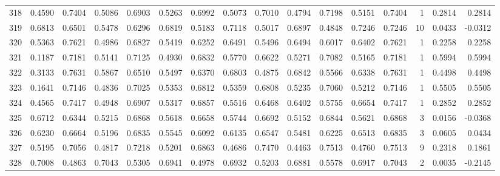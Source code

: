 \begin{tabular}{lrrrrrrrrrrrrrrr}
318 &      0.4590 &  0.7404 &  0.5086 &  0.6903 &  0.5263 &  0.6992 &  0.5073 &  0.7010 &  0.4794 &  0.7198 &   0.5151 &     0.7404 &      1 &                    0.2814 &                     0.2814 \\
319 &      0.6813 &  0.6501 &  0.5478 &  0.6296 &  0.6819 &  0.5183 &  0.7118 &  0.5017 &  0.6897 &  0.4848 &   0.7246 &     0.7246 &     10 &                    0.0433 &                    -0.0312 \\
320 &      0.5363 &  0.7621 &  0.4986 &  0.6827 &  0.5419 &  0.6252 &  0.6491 &  0.5496 &  0.6494 &  0.6017 &   0.6402 &     0.7621 &      1 &                    0.2258 &                     0.2258 \\
321 &      0.1187 &  0.7181 &  0.5141 &  0.7125 &  0.4930 &  0.6832 &  0.5770 &  0.6622 &  0.5271 &  0.7082 &   0.5165 &     0.7181 &      1 &                    0.5994 &                     0.5994 \\
322 &      0.3133 &  0.7631 &  0.5867 &  0.6510 &  0.5497 &  0.6370 &  0.6803 &  0.4875 &  0.6842 &  0.5566 &   0.6338 &     0.7631 &      1 &                    0.4498 &                     0.4498 \\
323 &      0.1641 &  0.7146 &  0.4836 &  0.7025 &  0.5353 &  0.6812 &  0.5359 &  0.6808 &  0.5235 &  0.7060 &   0.5212 &     0.7146 &      1 &                    0.5505 &                     0.5505 \\
324 &      0.4565 &  0.7417 &  0.4948 &  0.6907 &  0.5317 &  0.6857 &  0.5516 &  0.6468 &  0.6402 &  0.5755 &   0.6654 &     0.7417 &      1 &                    0.2852 &                     0.2852 \\
325 &      0.6712 &  0.6344 &  0.5215 &  0.6868 &  0.5618 &  0.6658 &  0.5744 &  0.6692 &  0.5152 &  0.6844 &   0.5621 &     0.6868 &      3 &                    0.0156 &                    -0.0368 \\
326 &      0.6230 &  0.6664 &  0.5196 &  0.6835 &  0.5545 &  0.6092 &  0.6135 &  0.6547 &  0.5481 &  0.6225 &   0.6513 &     0.6835 &      3 &                    0.0605 &                     0.0434 \\
327 &      0.5195 &  0.7056 &  0.4817 &  0.7218 &  0.5201 &  0.6863 &  0.4686 &  0.7470 &  0.4463 &  0.7513 &   0.4760 &     0.7513 &      9 &                    0.2318 &                     0.1861 \\
328 &      0.7008 &  0.4863 &  0.7043 &  0.5305 &  0.6941 &  0.4978 &  0.6932 &  0.5203 &  0.6881 &  0.5578 &   0.6917 &     0.7043 &      2 &                    0.0035 &                    -0.2145 \\

\end{tabular}
